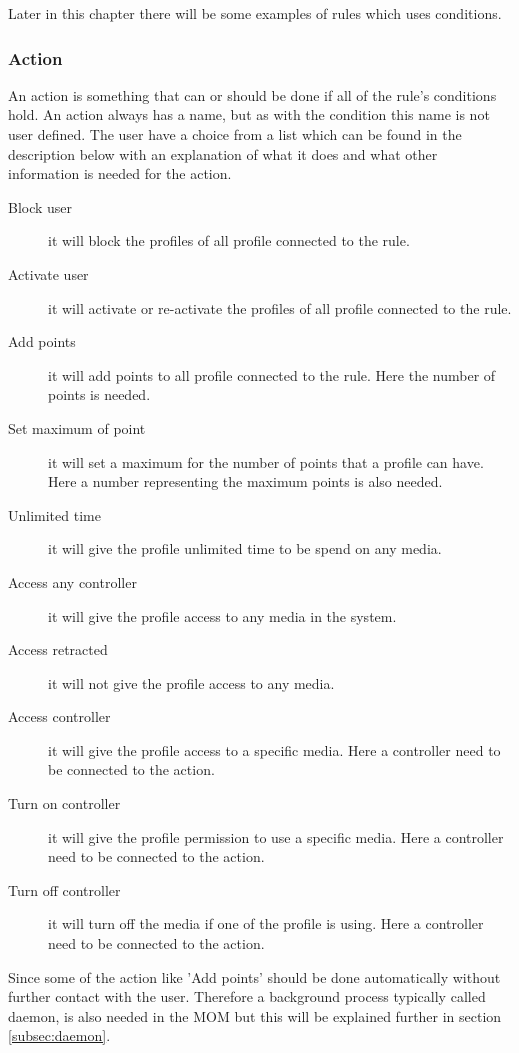 Later in this chapter there will be some examples of rules which uses conditions.

\subsubsection{Action}
An action is something that can or should be done if all of the rule's conditions hold. An action always has a name, but as with the condition this name is not user defined. The user have a choice from a list which can be found in the description below with an explanation of what it does and what other information is needed for the action.   

\begin{description}
	\item[Block user] it will block the profiles of all profile connected to the rule.
	\item[Activate user] it will activate or re-activate the profiles of all profile connected to the rule.
	\item[Add points] it will add points to all profile connected to the rule. Here the number of points is needed.
	\item[Set maximum of point] it will set a maximum for the number of points that a profile can have. Here a number representing the maximum points is also needed. 
	\item[Unlimited time] it will give the profile unlimited time to be spend on any media. 
	\item[Access any controller] it will give the profile access to any media in the system.
	\item[Access retracted] it will not give the profile access to any media. 
	\item[Access controller] it will give the profile access to a specific media. Here a controller need to be connected to the action.
	\item[Turn on controller] it will give the profile permission to use a specific media. Here a controller need to be connected to the action.
	\item[Turn off controller] it will turn off the media if one of the profile is using. Here a controller need to be connected to the action.
\end{description}
		
Since some of the action like 'Add points' should be done automatically without further contact with the user. Therefore a background process typically called daemon, is also needed in the MOM but this will be explained further in section \ref{subsec:daemon}. 
	


